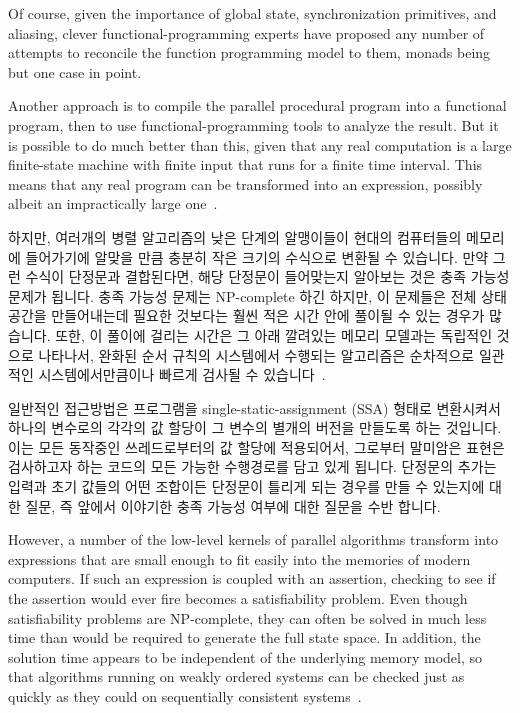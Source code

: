 Of course, given the importance of global state, synchronization
primitives, and aliasing, clever functional-programming experts have
proposed any number of attempts to reconcile the function programming
model to them, monads being but one case in point.

Another approach is to compile the parallel procedural program into
a functional program, then to use functional-programming tools to analyze
the result.
But it is possible to do much better than this, given that any real
computation is a large finite-state machine with finite input that
runs for a finite time interval.
This means that any real program can be transformed into an expression,
possibly albeit an impractically large one~\cite{VijayDSilva2012-sas}.
\fi

하지만, 여러개의 병렬 알고리즘의 낮은 단계의 알맹이들이 현대의 컴퓨터들의
메모리에 들어가기에 알맞을 만큼 충분히 작은 크기의 수식으로 변환될 수 있습니다.
만약 그런 수식이 단정문과 결합된다면, 해당 단정문이 들어맞는지 알아보는 것은
충족 가능성 문제가 됩니다.
충족 가능성 문제는 NP-complete 하긴 하지만, 이 문제들은 전체 상태 공간을
만들어내는데 필요한 것보다는 훨씬 적은 시간 안에 풀이될 수 있는 경우가
많습니다.
또한, 이 풀이에 걸리는 시간은 그 아래 깔려있는 메모리 모델과는 독립적인 것으로
나타나서, 완화된 순서 규칙의 시스템에서 수행되는 알고리즘은 순차적으로 일관적인
시스템에서만큼이나 빠르게 검사될 수 있습니다~\cite{JadeAlglave2013-cav}.

일반적인 접근방법은 프로그램을 single-static-assignment (SSA) 형태로 변환시켜서
하나의 변수로의 각각의 값 할당이 그 변수의 별개의 버전을 만들도록 하는
것입니다.
이는 모든 동작중인 쓰레드로부터의 값 할당에 적용되어서, 그로부터 말미암은
표현은 검사하고자 하는 코드의 모든 가능한 수행경로를 담고 있게 됩니다.
단정문의 추가는 입력과 초기 값들의 어떤 조합이든 단정문이 틀리게 되는 경우를
만들 수 있는지에 대한 질문, 즉 앞에서 이야기한 충족 가능성 여부에 대한 질문을
수반 합니다.
\iffalse

However, a number of the low-level kernels of parallel algorithms transform
into expressions that are small enough to fit easily into the memories
of modern computers.
If such an expression is coupled with an assertion, checking to see if
the assertion would ever fire becomes a satisfiability problem.
Even though satisfiability problems are NP-complete, they can often
be solved in much less time than would be required to generate the
full state space.
In addition, the solution time appears to be independent of the underlying
memory model, so that algorithms running on weakly ordered systems
can be checked just as quickly as they could on sequentially consistent
systems~\cite{JadeAlglave2013-cav}.

